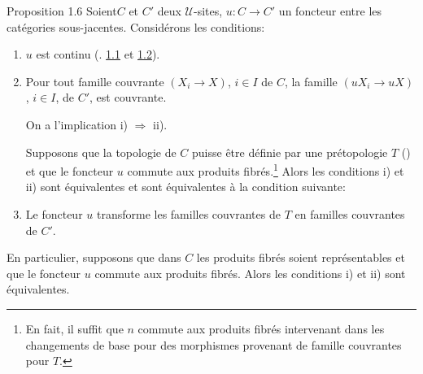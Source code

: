 \documentclass[10pt]{../fichiers-configuration-latex/smfart}
\begin{document}
\begin{enonce*}{Proposition 1.6}
Soient\pageoriginale $C$ et $C'$ deux $𝒰$-sites,
$u:C\rightarrow C'$ un foncteur entre les catégories
sous-jacentes. Considérons les conditions:
\begin{enumerate}
\renewcommand{\theenumi}{\roman{enumi}}
\renewcommand{\labelenumi}{\theenumi)}
\item $u$ est continu {\rm(\cf. \hyperref[III.def1.1]{1.1} et \hyperref[III.prop1.2]{1.2}).}

\item Pour tout famille couvrante $(X_i\rightarrow X)$, $i\in I$ de
  $C$, la famille $(uX_i\rightarrow uX)$, $i\in I$, de $C'$, est
  couvrante.

On a l'implication {\rm i) $\Rightarrow$ ii).}

Supposons que la topologie de $C$ puisse être définie par une
prétopologie {\rm $T$ ()} et que le foncteur $u$
commute aux produits fibrés.\footnote[1]{En fait, il suffit que $n$
commute aux
  produits fibrés intervenant dans les changements de base pour des
  morphismes provenant de famille couvrantes pour $T$.} Alors les
conditions {\rm i)} et {\rm ii)} sont équivalentes et sont
équivalentes à la condition suivante:

\item Le foncteur $u$ transforme les familles couvrantes de $T$ en
  familles couvrantes de $C'$.
\end{enumerate}

En particulier, supposons que dans $C$ les produits fibrés
soient représentables et que le foncteur $u$ commute aux
produits fibrés. Alors les conditions {\rm i)} et {\rm ii)} sont
équivalentes.
\end{enonce*}
\end{document}
